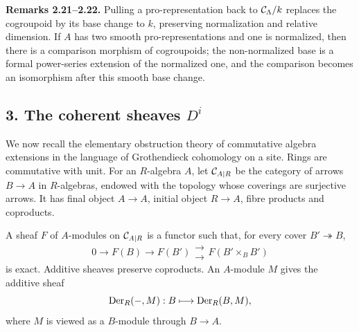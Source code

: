 \documentclass[11pt]{article}
\begin{document}
\textbf{Remarks 2.21--2.22.}  Pulling a pro-representation back to \(\mathcal C_\Lambda/k\) replaces the cogroupoid by its base change to \(k\), preserving normalization and relative dimension.  If \(A\) has two smooth pro-representations and one is normalized, then there is a comparison morphism of cogroupoids; the non-normalized base is a formal power-series extension of the normalized one, and the comparison becomes an isomorphism after this smooth base change.

\subsection*{3. The coherent sheaves \(D^i\)}

We now recall the elementary obstruction theory of commutative algebra extensions in the language of Grothendieck cohomology on a site.  Rings are commutative with unit.  For an \(R\)-algebra \(A\), let \(\mathcal C_{A|R}\) be the category of arrows \(B\to A\) in \(R\)-algebras, endowed with the topology whose coverings are surjective arrows.  It has final object \(A\to A\), initial object \(R\to A\), fibre products and coproducts.

A sheaf \(F\) of \(A\)-modules on \(\mathcal C_{A|R}\) is a functor such that, for every cover \(B'\twoheadrightarrow B\),
\[
0\to F(B)\to F(B')\mathrel{\substack{\longrightarrow\\[-.6ex]\longrightarrow}} F(B'\times_B B')
\]
is exact.  Additive sheaves preserve coproducts.  An \(A\)-module \(M\) gives the additive sheaf
\[
 \operatorname{Der}_R(-,M):B\longmapsto \operatorname{Der}_R(B,M),
\]
where \(M\) is viewed as a \(B\)-module through \(B\to A\).
\end{document}
